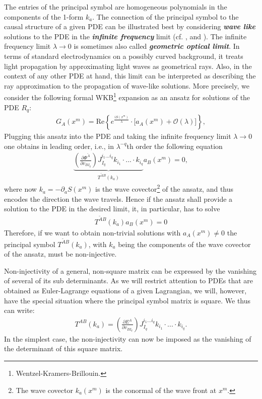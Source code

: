The entries of the principal symbol are homogeneous polynomials in the components of the 1-form $k_a$.
The connection of the principal symbol to the causal structure of a given PDE can be illustrated best by considering \textit{\textbf{wave like}} solutions to the PDE in the \textit{\textbf{infinite frequency}} limit (cf. \cite{2012arXiv1211.1914K}, \cite{2011PhRvD..83d4047R} and \cite{2018PhRvD..97h4036D}). 
The infinite frequency limit $\lambda \rightarrow 0 $ is sometimes also called \textit{\textbf{geometric optical limit}}. In terms of standard electrodynamics on a possibly curved background, it treats light propagation by approximating light waves as geometrical rays. Also, in the context of any other PDE at hand, this limit can be interpreted as describing the ray approximation to the propagation of wave-like solutions.
More precisely, we consider the following formal WKB\footnote{Wentzel-Kramers-Brillouin.} expansion as an ansatz for solutions of the PDE $R_q$:
\begin{align}\label{waveAns}
    G_A(x^m) = \mathrm{Re}\left \{ e^{\frac{iS(x^m)}{\lambda}} \cdot   \bigl [ a_A(x^m) + \mathcal{O}(\lambda) \bigr ]\right \},
\end{align}
Plugging this ansatz into the PDE and taking the infinite frequency limit $\lambda \rightarrow 0$ one obtains in leading order, i.e., in $\lambda^{-q}$th order the following equation
\begin{align}
    \underbrace{\left ( \frac{\partial \Phi^{\tilde{A}}}{\partial v_{BI_q}} \right ) J_{I_q}^{i_1...i_q} k_{i_1} \cdot ... \cdot k_{i_q}}_{T^{\tilde{A} B}(k_a)} a_B(x^m) = 0,
\end{align}
where now $k_a = - \partial_aS(x^m)$ is the wave covector\footnote{The wave covector $k_a(x^m)$ is the conormal of the wave front at $x^m$.} of the ansatz, and thus encodes the direction the wave travels. Hence if the ansatz shall provide a solution to the PDE in the desired limit, it, in particular, has to solve 
\begin{align}\label{solvabilityCond}
    T^{\tilde{A} B}(k_a) a_B(x^m) = 0
\end{align} 
Therefore, if we want to obtain non-trivial solutions with $a_A(x^m) \neq 0$ the principal symbol
$T^{\tilde{A} B}(k_a)$, with $k_a$ being the components of the wave covector of the ansatz, must be non-injective.

Non-injectivity of a general, non-square matrix can be expressed by the vanishing of several of its sub determinants. As we will restrict attention to PDEs that are obtained as Euler-Lagrange equations of a given Lagrangian, we will, however, have the special situation where the principal symbol matrix is square. We thus can write: 
\begin{align}
T^{A B}(k_a) =  \left ( \frac{\partial E^{A}}{\partial v_{BI_q}} \right ) J_{I_q}^{i_1...i_q} k_{i_1} \cdot ... \cdot k_{i_q}.
\end{align}
In the simplest case, the non-injectivity can now be imposed as the vanishing of the determinant of this square matrix.


